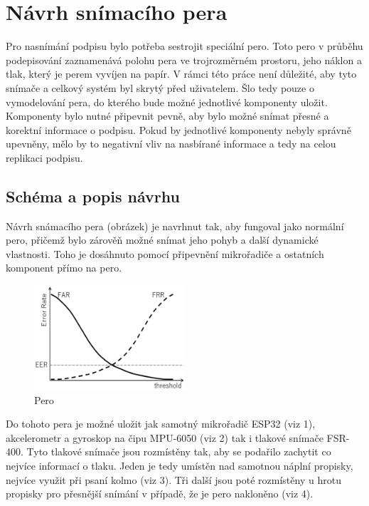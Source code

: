 \chapter{Návrh snímacího pera}
Pro nasnímání podpisu bylo potřeba sestrojit speciální pero.                                        %
Toto pero v průběhu podepisování zaznamenává polohu pera ve trojrozměrném prostoru,                 %
jeho náklon a tlak, který je perem vyvíjen na papír.                                                %
V rámci této práce není důležité, aby tyto snímače a celkový systém byl skrytý před uživatelem.     %
Šlo tedy pouze o vymodelování pera, do kterého bude možné jednotlivé komponenty uložit.             %
Komponenty bylo nutné připevnit pevně, aby bylo možné snímat přesné a korektní informace o podpisu. %
Pokud by jednotlivé komponenty nebyly správně upevněny,                                             %
mělo by to negativní vliv na nasbírané informace a tedy na celou replikaci podpisu.                 %
 
\section{Schéma a popis návrhu}
Návrh snámacího pera (obrázek) je navrhnut tak, aby fungoval jako normální pero, 
přičemž bylo zárověň možné snímat jeho pohyb a další dynamické vlastnosti.
Toho je dosáhnuto pomocí připevnění mikrořadiče a ostatních komponent přímo na pero.

\begin{figure}[h]
  \centering
  \includegraphics[width=0.5\textwidth]{obrazky-figures/FAR_FRR.png}
  \caption{Pero} 
  \label{fig:pero}
\end{figure}

Do tohoto pera je možné uložit jak samotný mikrořadič ESP32 (viz 1), akcelerometr a gyroskop na čipu MPU-6050 (viz 2) tak i tlakové snímače FSR-400.
Tyto tlakové snímače jsou rozmístěny tak, aby se podařilo zachytit co nejvíce informací o tlaku.
Jeden je tedy umístěn nad samotnou náplní propisky, nejvíce využit při psaní kolmo (viz 3).
Tři další jsou poté rozmístěny u hrotu propisky pro přesnější snímání v případě, že je pero nakloněno (viz 4). 


